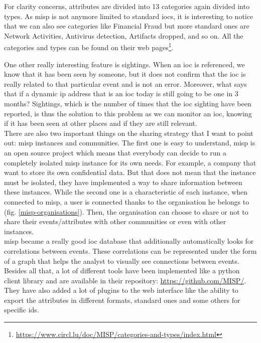 \documentclass{eplmastersthesis}
\begin{document}
For clarity concerns, attributes are divided into 13 categories again divided into types. As \gls{misp} is not anymore limited to standard \glspl{ioc}, it is interesting to notice that we can also see categories like Financial Fraud but more standard ones are Network Activities, Antivirus detection, Artifacts dropped, and so on.
All the categories and types can be found on their web pages\footnote {\url{https://www.circl.lu/doc/MISP/categories-and-types/index.html}}.

One other really interesting feature is sightings. When an \gls{ioc} is referenced, we know that it has been seen by someone, but it does not confirm that the \gls{ioc} is really related to that particular event and is not an error. Moreover, what says that if a dynamic \gls{ip} address that is an \gls{ioc} today is still going to be one in 3 months? 
Sightings, which is the number of times that the \gls{ioc} sighting have been reported, is thus the solution to this problem as we can monitor an \gls{ioc}, knowing if it has been seen at other places and if they are still relevant.\\


There are also two important things on the sharing strategy that I want to point out: \gls{misp} instances and communities. The first one is easy to understand, \gls{misp} is an open source project which means that everybody can decide to run a completely isolated \gls{misp} instance for its own needs. For example, a company that want to store its own confidential data. But that does not mean that the instance must be isolated, they have implemented a way to share information between these instances. While the second one is a characteristic of each instance, when connected to \gls{misp}, a user is connected thanks to the organisation he belongs to (fig. \ref{misp-organisations}). Then, the organisation can choose to share or not to share their events/attributes with other communities or even with other instances. \\ 


\gls{misp} became a really good \gls{ioc} database that additionally automatically looks for correlations between events. These correlations can be represented under the form of a graph that helps the analyst to visually see connections between events.\\

Besides all that, a lot of different tools have been implemented like a python client library and are available in their repository: \url{https://github.com/MISP/}.
They have also added a lot of plugins to the web interface like the ability to export the attributes in different formats, standard ones and some others for specific \gls{ids}.\\
\end{document}
